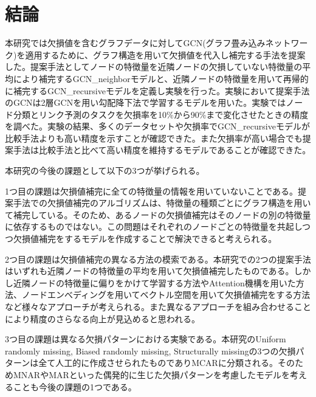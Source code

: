 \chapter{結論}
本研究では欠損値を含むグラフデータに対してGCN(グラフ畳み込みネットワーク)を適用するために、グラフ構造を用いて欠損値を代入し補完する手法を提案した。提案手法としてノードの特徴量を近隣ノードの欠損していない特徴量の平均により補完するGCN\_neighborモデルと、近隣ノードの特徴量を用いて再帰的に補完するGCN\_recursiveモデルを定義し実験を行った。実験において提案手法のGCNは2層GCNを用い勾配降下法で学習するモデルを用いた。実験ではノード分類とリンク予測のタスクを欠損率を10\%から90\%まで変化させたときの精度を調べた。実験の結果、多くのデータセットや欠損率でGCN\_recursiveモデルが比較手法よりも高い精度を示すことが確認できた。また欠損率が高い場合でも提案手法は比較手法と比べて高い精度を維持するモデルであることが確認できた。

本研究の今後の課題として以下の3つが挙げられる。

1つ目の課題は欠損値補完に全ての特徴量の情報を用いていないことである。提案手法での欠損値補完のアルゴリズムは、特徴量の種類ごとにグラフ構造を用いて補完している。そのため、あるノードの欠損値補完はそのノードの別の特徴量に依存するものではない。この問題はそれぞれのノードごとの特徴量を共起しつつ欠損値補完をするモデルを作成することで解決できると考えられる。

2つ目の課題は欠損値補完の異なる方法の模索である。本研究での2つの提案手法はいずれも近隣ノードの特徴量の平均を用いて欠損値補完したものである。しかし近隣ノードの特徴量に偏りをかけて学習する方法やAttention機構を用いた方法、ノードエンべディングを用いてベクトル空間を用いて欠損値補完をする方法など様々なアプローチが考えられる。また異なるアプローチを組み合わせることにより精度のさらなる向上が見込めると思われる。

3つ目の課題は異なる欠損パターンにおける実験である。本研究のUniform randomly missing, Biased randomly missing, Structurally missingの3つの欠損パターンは全て人工的に作成させられたものでありMCARに分類される。そのためMNARやMARといった偶発的に生じた欠損パターンを考慮したモデルを考えることも今後の課題の1つである。
